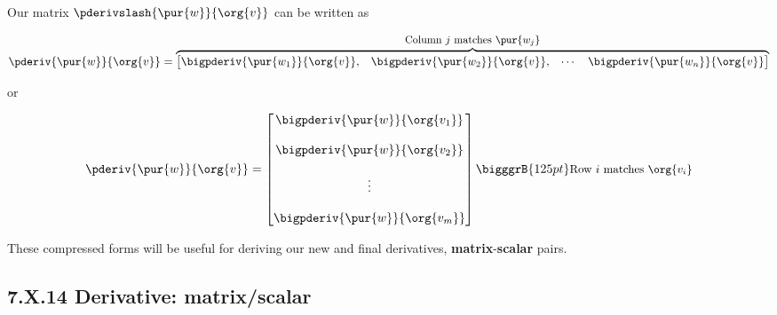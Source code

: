         \begin{notation}
            Our matrix $\pderivslash{ \pur{w} }{ \org{v} }$ can be written as
            
            \begin{equation*}
                \pderiv{ \pur{w} }{ \org{v} } 
                =
                \overbrace{
                    \begin{bmatrix}
                        \bigpderiv{ \pur{w_1} }{ \org{v} }, &
                        \bigpderiv{ \pur{w_2} }{ \org{v} }, &
                        \cdots &
                        \bigpderiv{ \pur{w_n} }{ \org{v} } 
                    \end{bmatrix}
                }^{ \text{\small Column $j$ matches $\pur{w_j}$} }
            \end{equation*}
            
            \phantom{}
            
            \centerline{or \phantom{xxxxxxxxxx}}
            
            \phantom{}
            
            \begin{equation*}
                \pderiv{ \pur{w} }{ \org{v} } 
                =
                \begin{bmatrix}
                    \bigpderiv{ \pur{w} }   { \org{v_1} }\\ 
                    \\
                    \bigpderiv{ \pur{w} }   { \org{v_2} }\\ 
                    \\
                    \vdots \\ 
                    \\
                    \bigpderiv{ \pur{w} }   { \org{v_m} }
                \end{bmatrix}
                \bigggrB{125pt} \text{\small Row $i$ matches $\org{v_i}$} 
            \end{equation*}
        \end{notation}
        
        These compressed forms will be useful for deriving our new and final derivatives, \textbf{matrix}-\textbf{scalar} pairs.
            
    \secdiv
    
    \subsection*{7.X.14 \quad Derivative: matrix/scalar}
    
